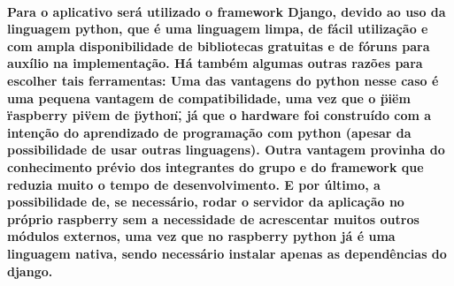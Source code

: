 \paragraph{Para o aplicativo será utilizado o framework Django, devido ao uso da linguagem python, que é uma linguagem limpa, de fácil utilização e com ampla disponibilidade de bibliotecas gratuitas e de fóruns para auxílio na implementação.
Há também algumas outras razões para escolher tais ferramentas:
Uma das vantagens do python nesse caso é uma pequena vantagem de compatibilidade, uma vez que o \"pi\" em \"raspberry pi\" vem de \"python\", já que o hardware foi construído com a intenção do aprendizado de programação com python (apesar da possibilidade de usar outras linguagens). Outra vantagem provinha do conhecimento prévio dos integrantes do grupo e do framework que reduzia muito o tempo de desenvolvimento. E por último, a possibilidade de, se necessário, rodar o servidor da aplicação no próprio raspberry sem a necessidade de acrescentar muitos outros módulos externos, uma vez que no raspberry python já é uma linguagem nativa, sendo necessário instalar apenas as dependências do django.
}